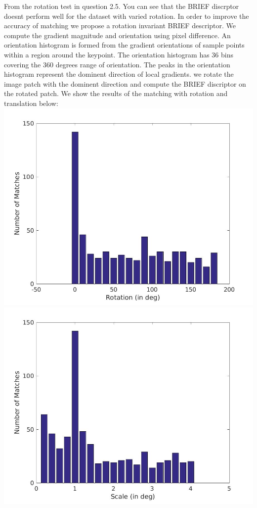 \documentclass[12pt]{article}
\newenvironment{problem}[2][Problem]{\begin{trivlist}
\item[\hskip \labelsep {\bfseries #1}\hskip \labelsep {\bfseries #2.}]}{\end{trivlist}}
\begin{document}
\begin{problem}{7.1}
From the rotation test in question 2.5. You can see that the BRIEF discrptor doesnt perform well for the dataset with varied rotation. In order to improve the accuracy of matching we propose a rotation invariant BRIEF descriptor. We compute the gradient magnitude and orientation using pixel difference. An orientation histogram is formed from the gradient orientations of sample points within a region around the keypoint. The orientation histogram has 36 bins covering the 360 degrees range of orientation. The peaks in the orientation histogram represent the dominent direction of local gradients. we rotate the image patch with the dominent direction and compute the BRIEF discriptor on the rotated patch. We show the results of the matching with rotation and translation below:\\


\includegraphics[scale=0.2]{results/EC1_RotErr}
\includegraphics[scale=0.2]{results/EC1_ScalErr}
\end{problem}
\end{document}
